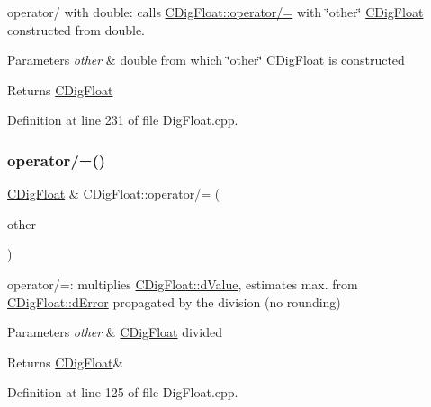 operator/ with double\+: calls \hyperlink{classCDigFloat_a53d3939dfc89d172f1bf803a46bc3369}{C\+Dig\+Float\+::operator/=} with \char`\"{}other\char`\"{} \hyperlink{classCDigFloat}{C\+Dig\+Float} constructed from double. 


\begin{DoxyParams}{Parameters}
{\em other} & double from which \char`\"{}other\char`\"{} \hyperlink{classCDigFloat}{C\+Dig\+Float} is constructed \\
\hline
\end{DoxyParams}
\begin{DoxyReturn}{Returns}
\hyperlink{classCDigFloat}{C\+Dig\+Float} 
\end{DoxyReturn}


Definition at line 231 of file Dig\+Float.\+cpp.

\mbox{\label{classCDigFloat_a53d3939dfc89d172f1bf803a46bc3369}} 
\subsubsection{\texorpdfstring{operator/=()}{operator/=()}\hspace{0.1cm}{\footnotesize\ttfamily [1/2]}}
{\footnotesize\ttfamily \hyperlink{classCDigFloat}{C\+Dig\+Float} \& C\+Dig\+Float\+::operator/= (\begin{DoxyParamCaption}\item[{const \hyperlink{classCDigFloat}{C\+Dig\+Float} \&}]{other }\end{DoxyParamCaption})}



operator/=\+: multiplies \hyperlink{classCDigFloat_a4bbe69e30dd4e20527362493aa9aaf96}{C\+Dig\+Float\+::d\+Value}, estimates max. from \hyperlink{classCDigFloat_a25eb3782d1e727ff007a48f8308e3d4d}{C\+Dig\+Float\+::d\+Error} propagated by the division (no rounding) 


\begin{DoxyParams}{Parameters}
{\em other} & \hyperlink{classCDigFloat}{C\+Dig\+Float} divided \\
\hline
\end{DoxyParams}
\begin{DoxyReturn}{Returns}
\hyperlink{classCDigFloat}{C\+Dig\+Float}\& 
\end{DoxyReturn}


Definition at line 125 of file Dig\+Float.\+cpp.



